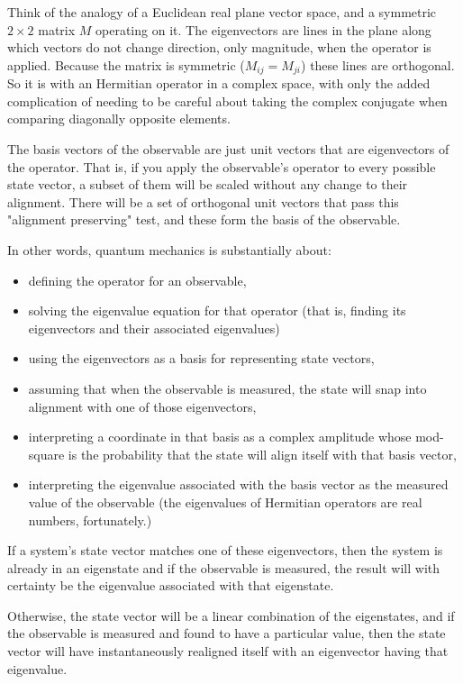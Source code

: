 Think of the analogy of a Euclidean real plane vector space, and a symmetric $2 \times 2$ matrix $M$ operating on it. The eigenvectors are lines in the plane along which vectors do not change direction, only magnitude, when the operator is applied. Because the matrix is symmetric ($M_{ij} = M_{ji}$) these lines are orthogonal. So it is with an Hermitian operator in a complex space, with only the added complication of needing to be careful about taking the complex conjugate when comparing diagonally opposite elements.

The basis vectors of the observable are just unit vectors that are eigenvectors of the operator. That is, if you apply the observable's operator to every possible state vector, a subset of them will be scaled without any change to their alignment. There will be a set of orthogonal unit vectors that pass this "alignment preserving" test, and these form the basis of the observable.

In other words, quantum mechanics is substantially about:

\begin{itemize}
  \item defining the operator for an observable,
  \item solving the eigenvalue equation for that operator (that is, finding its eigenvectors and their associated eigenvalues)
  \item using the eigenvectors as a basis for representing state vectors,
  \item assuming that when the observable is measured, the state will snap into alignment with one of those eigenvectors,
  \item interpreting a coordinate in that basis as a complex amplitude whose mod-square is the probability that the state will align itself with that basis vector,
  \item interpreting the eigenvalue associated with the basis vector as the measured value of the observable (the eigenvalues of Hermitian operators are real numbers, fortunately.)
\end{itemize}

If a system's state vector matches one of these eigenvectors, then the system is already in an eigenstate and if the observable is measured, the result will with certainty be the eigenvalue associated with that eigenstate.

Otherwise, the state vector will be a linear combination of the eigenstates, and if the observable is measured and found to have a particular value, then the state vector will have instantaneously realigned itself with an eigenvector having that eigenvalue.

